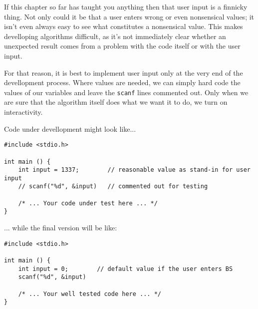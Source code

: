 \begin{hintbox}
If this chapter so far has taught you anything then that user input is a finnicky thing. Not only could it be that a user enters wrong or even nonsensical values; it isn't even always easy to see what constitutes a nonsensical value. This makes develloping algorithms difficult, as it's not immediately clear whether an unexpected result comes from a problem with the code itself or with the user input.

For that reason, it is best to implement user input only at the very end of the devellopment process. Where values are needed, we can simply hard code the values of our variables and leave the \texttt{scanf} lines commented out. Only when we are sure that the algorithm itself does what we want it to do, we turn on interactivity.

Code under devellopment might look like...
\begin{codebox}
\begin{verbatim}
#include <stdio.h>

int main () {
    int input = 1337;        // reasonable value as stand-in for user input
    // scanf("%d", &input)   // commented out for testing
    
    /* ... Your code under test here ... */
}
\end{verbatim}
\end{codebox}
\end{hintbox}
%
\begin{hintbox}[]
... while the final version will be like:
\vspace{6pt}

\begin{codebox}
\begin{verbatim}
#include <stdio.h>

int main () {
    int input = 0;        // default value if the user enters BS
    scanf("%d", &input)
    
    /* ... Your well tested code here ... */
}
\end{verbatim}
\end{codebox}
\end{hintbox}

